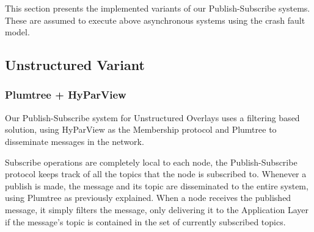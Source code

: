 \documentclass[sigconf]{acmart}
\begin{document}
This section presents the implemented variants of our Publish-Subscribe systems. These are assumed to execute above asynchronous systems using the crash fault model. 

\subsection{Unstructured Variant}

\subsubsection{Plumtree + HyParView} %

Our Publish-Subscribe system for Unstructured Overlays uses a filtering based solution, using HyParView as the Membership protocol and Plumtree to disseminate messages in the network.

Subscribe operations are completely local to each node, the Publish-Subscribe protocol keeps track of all the topics that the node is subscribed to.
Whenever a publish is made, the message and its topic are disseminated to the entire system, using Plumtree as previously explained. When a node receives the published message, it simply filters the message, only delivering it to the Application Layer if the message’s topic is contained in the set of currently subscribed topics.
\end{document}
